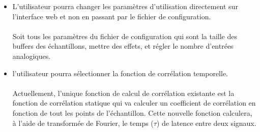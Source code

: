 \documentclass{article}
\begin{document}
\begin{itemize}
 \item L'utilisateur pourra changer les paramètres d'utilisation directement sur
       l'interface web et non en passant par le fichier de configuration.
       \paragraph{}
       Soit tous les paramètres du fichier de configuration qui sont la taille des buffers
       des échantillons, mettre des effets, et régler le nombre d'entrées analogiques.
       
 \item l'utilisateur pourra sélectionner la fonction de corrélation temporelle.
       \paragraph{}
       Actuellement, l'unique fonction de calcul de corrélation existante est
       la fonction de corrélation statique qui va calculer un coefficient de corrélation
       en fonction de tout les points de l’échantillon. Cette nouvelle fonction
       calculera, à l'aide de transformée de Fourier, le temps ($\tau$) de latence
       entre deux signaux.
       
       
\end{itemize}
\end{document}

